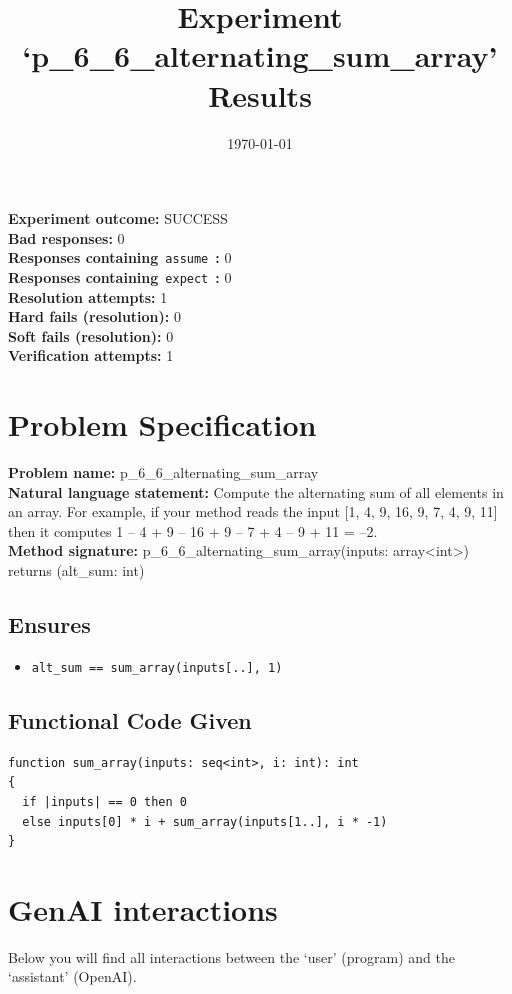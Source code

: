 \documentclass{article}
\begin{document}
\title{Experiment `p\_6\_6\_alternating\_sum\_array' Results}
\author{\today}
\date{}
\maketitle
\textbf{Experiment outcome: }SUCCESS
\\\textbf{Bad responses: }0
\\\textbf{Responses containing}~\texttt{assume}~\textbf{: }0
\\\textbf{Responses containing}~\texttt{expect}~\textbf{: }0
\\\textbf{Resolution attempts: }1
\\\textbf{Hard fails (resolution): }0
\\\textbf{Soft fails (resolution): }0
\\\textbf{Verification attempts: }1
\section*{Problem Specification}
\textbf{Problem name: }p\_6\_6\_alternating\_sum\_array
\\\textbf{Natural language statement: }Compute the alternating sum of all elements in an array. For example, if your method reads the input [1, 4, 9, 16, 9, 7, 4, 9, 11] then it computes 1 – 4 + 9 – 16 + 9 – 7 + 4 – 9 + 11 = –2.
\\\textbf{Method signature: }p\_6\_6\_alternating\_sum\_array(inputs: array<int>) returns (alt\_sum: int)
\subsection*{Ensures}
\begin{itemize}
\item \texttt{alt\_sum == sum\_array(inputs[..], 1)}
\end{itemize}
\subsection*{Functional Code Given}
\begin{lstlisting}
function sum_array(inputs: seq<int>, i: int): int
{
  if |inputs| == 0 then 0
  else inputs[0] * i + sum_array(inputs[1..], i * -1)
}
\end{lstlisting}
\clearpage
\section*{GenAI interactions}
Below you will find all interactions between the `user' (program) and the `assistant' (OpenAI).
\end{document}

